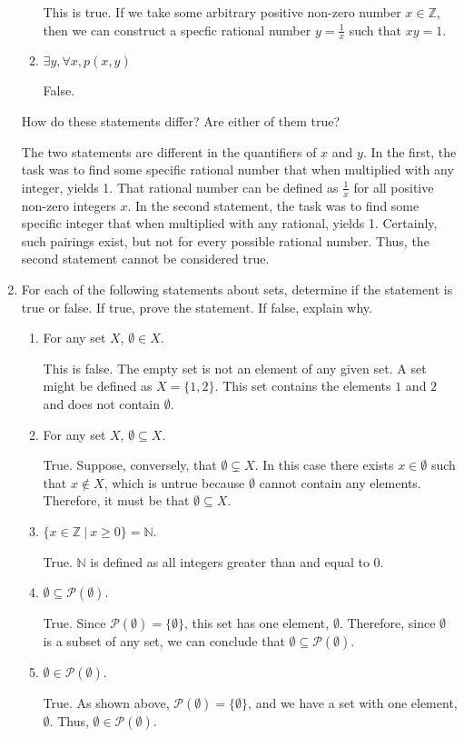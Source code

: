 \documentclass[12pt]{article}
\newcommand{\Z}{\mathbb{Z}}
\newcommand{\N}{\mathbb{N}}
\begin{document}
\begin{enumerate}
\begin{enumerate}
This is true. If we take some arbitrary positive non-zero number $x \in \Z$, then we can construct a specfic rational number $y = \frac{1}{x}$ such that $xy = 1$. 
\item $\exists y, \forall x, p(x, y)$

False. 
\end{enumerate}
How do these statements differ? Are either of them true?

The two statements are different in the quantifiers of $x$ and $y$. In the first, the task was to find some specific rational number that when multiplied with any integer, yields 1. That rational number can be defined as $\frac{1}{x}$ for all positive non-zero integers $x$. In the second statement, the task was to find some specific integer that when multiplied with any rational, yields 1. Certainly, such pairings exist, but not for every possible rational number. Thus, the second statement cannot be considered true.

\item For each of the following statements about sets, determine if the statement is true or false. If true, prove the statement. If false, explain why.
\begin{enumerate}
\item For any set $X$, $\emptyset\in X$.

This is false. The empty set is not an element of any given set. A set might be defined as $X = \{1, 2\}$. This set contains the elements $1$ and $2$ and does not contain $\emptyset$. 
\item For any set $X$, $\emptyset\subseteq X$.

True. Suppose, conversely, that $\emptyset \subsetneq X$. In this case there exists $x \in \emptyset$ such that $x \notin X$, which is untrue because $\emptyset$ cannot contain any elements. Therefore, it must be that $\emptyset\subseteq X$.
\item $\{x\in \Z\ | \ x\geq 0\} = \N$.

True. $\N$ is defined as all integers greater than and equal to 0. 
\item $\emptyset \subseteq \mathcal{P}(\emptyset)$.

True. Since $\mathcal{P}(\emptyset) = \{\emptyset\}$, this set has one element, $\emptyset$. Therefore, since $\emptyset$ is a subset of any set, we can conclude that $\emptyset \subseteq \mathcal{P}(\emptyset)$.
\item $\emptyset \in \mathcal{P}(\emptyset)$.

True. As shown above, $\mathcal{P}(\emptyset) = \{\emptyset\}$, and we have a set with one element, $\emptyset$. Thus, $\emptyset \in \mathcal{P}(\emptyset)$.
\end{enumerate}


\end{enumerate}
\end{document}
